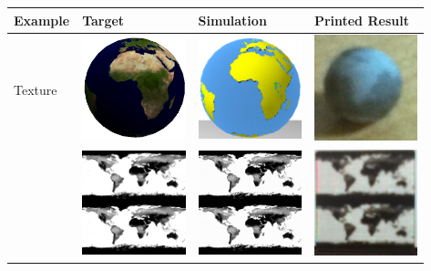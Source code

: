 \documentclass[annual]{acmsiggraph}
\begin{document}
\begin{table}
\centering
\begin{tabular}{|p{2cm}|l|l|l|}
\hline
\textbf{Example} & \textbf{Target} & \textbf{Simulation} & \textbf{Printed Result}\\
\hline
Texture&  \includegraphics[width=3cm]{figure/globeTarget.png}& \includegraphics[width=3cm]{figure/globeSim.png}
& \includegraphics[width=3cm]{figure/globe.png}\\
&  \includegraphics[width=3cm]{figure/mapTarget.png}& \includegraphics[width=3cm]{figure/mapSim.png}
& \includegraphics[width=3cm]{figure/map.png}\\

\end{tabular}
\end{table}
\end{document}
